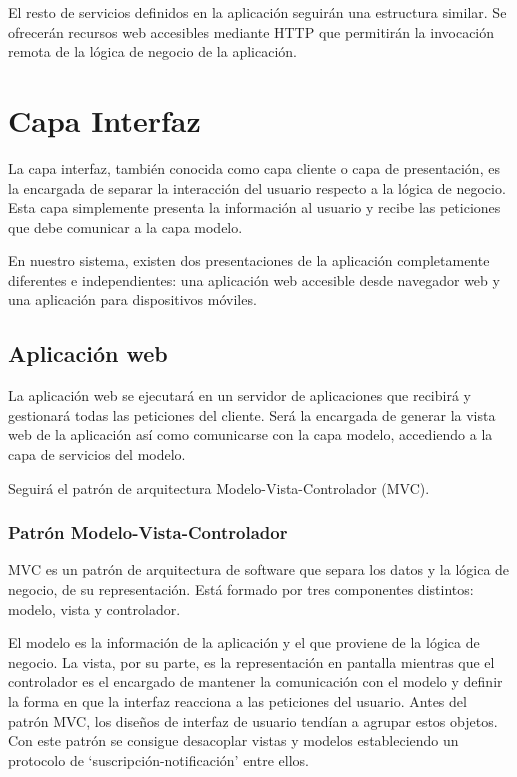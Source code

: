 El resto de servicios definidos en la aplicación seguirán una estructura similar. Se ofrecerán recursos web accesibles mediante HTTP que permitirán la invocación remota de la lógica de negocio de la aplicación.


\section{Capa Interfaz}
La capa interfaz, también conocida como capa cliente o capa de presentación, es la encargada de separar la interacción del usuario respecto a la lógica de negocio. Esta capa simplemente presenta la información al usuario y recibe las peticiones que debe comunicar a la capa modelo.

En nuestro sistema, existen dos presentaciones de la aplicación completamente diferentes e independientes: una aplicación web accesible desde navegador web y una aplicación para dispositivos móviles.

\subsection{Aplicación web}
La aplicación web se ejecutará en un servidor de aplicaciones que recibirá y gestionará todas las peticiones del cliente. Será la encargada de generar la vista web de la aplicación así como comunicarse con la capa modelo, accediendo a la capa de servicios del modelo.

Seguirá el patrón de arquitectura Modelo-Vista-Controlador (MVC).

\subsubsection*{Patrón Modelo-Vista-Controlador}
MVC es un patrón de arquitectura de software que separa los datos y la lógica de negocio, de su representación. Está formado por tres componentes distintos: modelo, vista y controlador.

El modelo es la información de la aplicación y el que proviene de la lógica de negocio. La vista, por su parte, es la representación en pantalla mientras que el controlador es el encargado de mantener la comunicación con el modelo y definir la forma en que la interfaz reacciona a las peticiones del usuario. Antes del patrón MVC, los diseños de interfaz de usuario tendían a agrupar estos objetos. Con este patrón se consigue desacoplar vistas y modelos estableciendo un protocolo de `suscripción-notificación' entre ellos.

